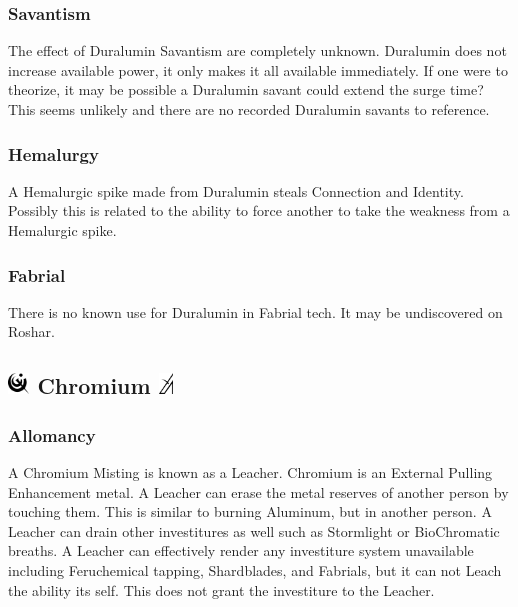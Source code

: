 \documentclass[conference]{IEEEtran}
\newcommand{\n}{\hfill\break}
\begin{document}
\subsubsection*{\textbf{Savantism}}
The effect of Duralumin Savantism are completely unknown.  Duralumin does not increase available power, it only makes it all available immediately.  If one were to theorize, it may be possible a Duralumin savant could extend the surge time?  This seems unlikely and there are no recorded Duralumin savants to reference.\\
\subsubsection*{\textbf{Hemalurgy}}
A Hemalurgic spike made from Duralumin steals Connection and Identity.\cite{dl-comp}  Possibly this is related to the ability to force another to take the weakness from a Hemalurgic spike.\cite{BoM-CH27}\\
\subsubsection*{\textbf{Fabrial}}
There is no known use for Duralumin in Fabrial tech.  It may be undiscovered on Roshar.\n
\subsection*{\includegraphics[height=1em]{images/Chromium.png}  \textbf{Chromium} \includegraphics[height=1em]{images/Chromium_(Feruchemy).png}}
\subsubsection*{\textbf{Allomancy}}
A Chromium Misting is known as a Leacher.\cite{ARS}  Chromium is an External Pulling Enhancement metal.\cite{AL-TB} A Leacher can erase the metal reserves of another person by touching them.\cite{ARS}  This is similar to burning Aluminum, but in another person.  A Leacher can drain other investitures as well such as Stormlight\cite{leech-storm} or BioChromatic breaths.\cite{leech-breath}  A Leacher can effectively render any investiture system unavailable including Feruchemical tapping,\cite{leech-fe} Shardblades,\cite{leech-blade} and Fabrials,\cite{leech-disarm} but it can not Leach the ability its self.  This does not grant the investiture to the Leacher.\cite{leech-disarm}\\
\end{document}
